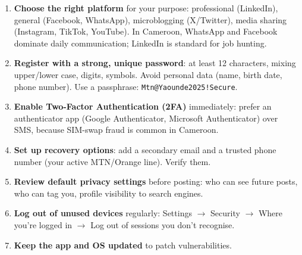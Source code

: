 \documentclass[11pt]{article}
\begin{document}
\begin{methode}
\begin{enumerate}
    \item \textbf{Choose the right platform} for your purpose: professional (LinkedIn), general (Facebook, WhatsApp), microblogging (X/Twitter), media sharing (Instagram, TikTok, YouTube). In Cameroon, WhatsApp and Facebook dominate daily communication; LinkedIn is standard for job hunting.
    \item \textbf{Register with a strong, unique password}: at least 12 characters, mixing upper/lower case, digits, symbols. Avoid personal data (name, birth date, phone number). Use a passphrase: \texttt{Mtn@Yaounde2025!Secure}.
    \item \textbf{Enable Two-Factor Authentication (2FA)} immediately: prefer an authenticator app (Google Authenticator, Microsoft Authenticator) over SMS, because SIM-swap fraud is common in Cameroon.
    \item \textbf{Set up recovery options}: add a secondary email and a trusted phone number (your active MTN/Orange line). Verify them.
    \item \textbf{Review default privacy settings} before posting: who can see future posts, who can tag you, profile visibility to search engines.
    \item \textbf{Log out of unused devices} regularly: Settings $\rightarrow$ Security $\rightarrow$ Where you're logged in $\rightarrow$ Log out of sessions you don't recognise.
    \item \textbf{Keep the app and OS updated} to patch vulnerabilities.
\end{enumerate}
\end{methode}
\end{document}
